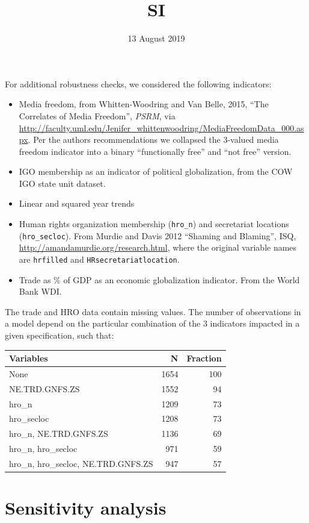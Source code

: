\documentclass[]{article}
\title{SI}
\author{}
\date{13 August 2019}
\providecommand{\tightlist}{%
  \setlength{\itemsep}{0pt}\setlength{\parskip}{0pt}}
\begin{document}
\maketitle

{
\setcounter{tocdepth}{2}
\tableofcontents
}
For additional robustness checks, we considered the following
indicators:

\begin{itemize}
\tightlist
\item
  Media freedom, from Whitten-Woodring and Van Belle, 2015, ``The
  Correlates of Media Freedom'', \emph{PSRM}, via
  \url{http://faculty.uml.edu/Jenifer_whittenwoodring/MediaFreedomData_000.aspx}.
  Per the authors recommendations we collapsed the 3-valued media
  freedom indicator into a binary ``functionally free'' and ``not free''
  version.
\item
  IGO membership as an indicator of political globalization, from the
  COW IGO state unit dataset.
\item
  Linear and squared year trends
\item
  Human rights organization membership (\texttt{hro\_n}) and secretariat
  locations (\texttt{hro\_secloc}). From Murdie and Davis 2012 ``Shaming
  and Blaming'', ISQ, \url{http://amandamurdie.org/research.html}, where
  the original variable names are \texttt{hrfilled} and
  \texttt{HRsecretariatlocation}.
\item
  Trade as \% of GDP as an economic globalization indicator. From the
  World Bank WDI.
\end{itemize}

The trade and HRO data contain missing values. The number of
observations in a model depend on the particular combination of the 3
indicators impacted in a given specification, such that:

\begin{longtable}[]{@{}lrr@{}}
\toprule
Variables & N & Fraction\tabularnewline
\midrule
\endhead
None & 1654 & 100\tabularnewline
NE.TRD.GNFS.ZS & 1552 & 94\tabularnewline
hro\_n & 1209 & 73\tabularnewline
hro\_secloc & 1208 & 73\tabularnewline
hro\_n, NE.TRD.GNFS.ZS & 1136 & 69\tabularnewline
hro\_n, hro\_secloc & 971 & 59\tabularnewline
hro\_n, hro\_secloc, NE.TRD.GNFS.ZS & 947 & 57\tabularnewline
\bottomrule
\end{longtable}

\hypertarget{sensitivity-analysis}{%
\section{Sensitivity analysis}\label{sensitivity-analysis}}
\end{document}

